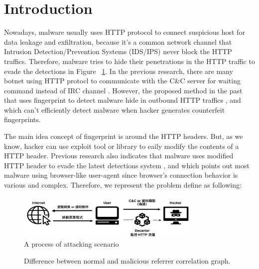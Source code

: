 \section{Introduction}

Nowadays, malware usually uses HTTP protocol to connect suspicious host for data leakage and exfiltration, because it's a common network channel that Intrusion Detection/Prevention Systems (IDS/IPS) never block the HTTP traffics. Therefore, malware tries to hide their penetrations in the HTTP traffic to evade the detections in Figure ~\ref{fig:attack}. In the previous research, there are many botnet using HTTP protocl to communicate with the C\&C server for waiting command instead of IRC channel \cite{gu2008botsniffer}. However, the proposed method in the past that uses fingerprint to detect malware hide in outbound HTTP traffics \cite{bortolameotti2017decanter}, and which can't efficiently detect malware when hacker generates counterfeit fingerprints.  

The main idea concept of fingerprint is around the HTTP headers. But, as we know, hacker can use exploit tool or library to eaily modify the contents of a HTTP header. Previous research also indicates that malware uses modified HTTP header to evade the latest detections system \cite{grill2014malware}, and which points out most malware using browser-like user-agent since browser's connection behavior is various and complex. Therefore, we represent the problem define as following:

\begin{figure}[!t]
\centering
\includegraphics[width=250pt]{image/attack.png}
\caption{A process of attacking scenario}
\label{fig:attack}
\end{figure}


\begin{figure}[!tbp]
  \centering
  \hfill
  \caption{Difference between normal and malicious referrer correlation graph.}
\label{fig:length_count}
\end{figure}

